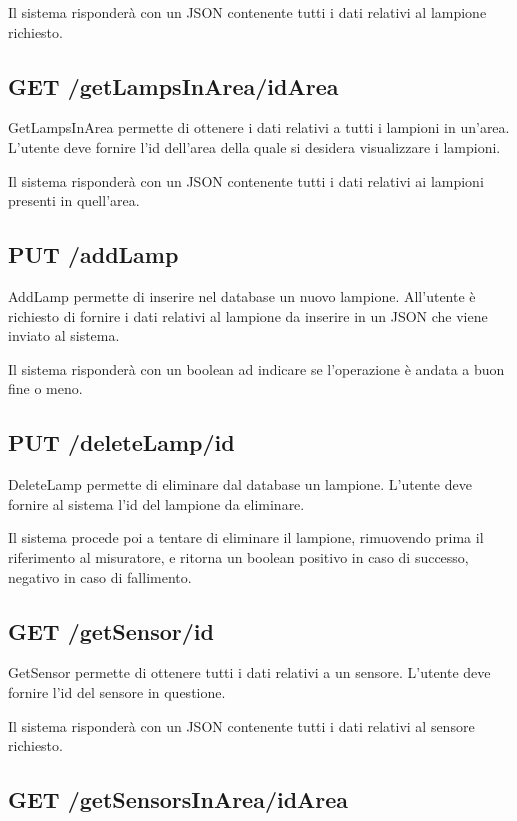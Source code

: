 Il sistema risponderà con un JSON contenente tutti i dati relativi al lampione richiesto.

\subsection{ GET /getLampsInArea/idArea}

GetLampsInArea permette di ottenere i dati relativi a tutti i lampioni in un'area. L'utente deve fornire l'id dell'area della quale si desidera visualizzare i lampioni.

Il sistema risponderà con un JSON contenente tutti i dati relativi ai lampioni presenti in quell'area.

\subsection{ PUT /addLamp}

AddLamp permette di inserire nel database un nuovo lampione. All'utente è richiesto di fornire i dati relativi al lampione da inserire in un JSON che viene inviato al sistema.

Il sistema risponderà con un boolean ad indicare se l'operazione è andata a buon fine o meno.

\subsection{ PUT /deleteLamp/id}

DeleteLamp permette di eliminare dal database un lampione. L'utente deve fornire al sistema l'id del lampione da eliminare.

Il sistema procede poi a tentare di eliminare il lampione, rimuovendo prima il riferimento al misuratore, e ritorna un boolean positivo in caso di successo, negativo in caso di fallimento.

\subsection{ GET /getSensor/id}

GetSensor permette di ottenere tutti i dati relativi a un sensore. L'utente deve fornire l'id del sensore in questione.

Il sistema risponderà con un JSON contenente tutti i dati relativi al sensore richiesto.

\subsection{ GET /getSensorsInArea/idArea}

